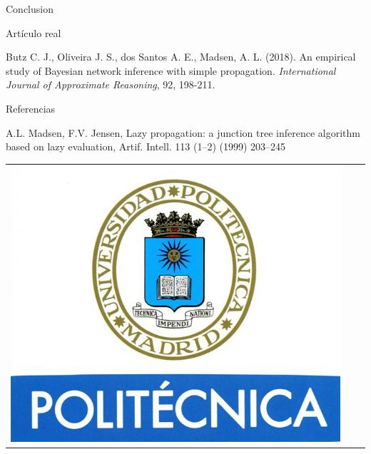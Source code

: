 \documentclass[final]{beamer}
\newlength{\onecolwid}
\begin{document}
\begin{frame}[t]
\begin{columns}[t]
\begin{column}{\onecolwid}
\begin{block}{Conclusion}
\end{block}


\begin{block}{Artículo real}

Butz C. J., Oliveira J. S., dos Santos A. E., Madsen, A. L. (2018). An empirical study of Bayesian network inference with simple propagation. \textit{International Journal of Approximate Reasoning}, 92, 198-211.

\end{block}



\begin{block}{Referencias}
\nocite{*} %
\small{
\vspace{0.75in}}
\begin{thebibliography}{}

A.L. Madsen, F.V. Jensen, Lazy propagation: a junction tree inference algorithm based on lazy evaluation, Artif. Intell. 113 (1–2) (1999) 203–245

\end{thebibliography}


\end{block}



\begin{center}
\begin{tabular}{ccc}
\includegraphics[width=0.4\linewidth]{logoUPM.jpg} 
\end{tabular}
\end{center}


\end{column}
\end{columns}
\end{frame}
\end{document}
